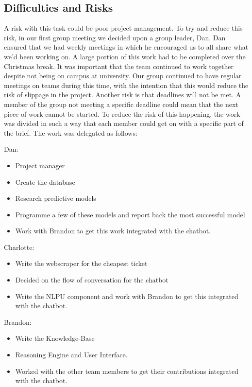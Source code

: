\documentclass[11pt]{article}
\begin{document}
	\subsection{Difficulties and Risks}
	
A risk with this task could be poor project management. To try and reduce this risk, in our first group meeting we decided upon a group leader, Dan. Dan ensured that we had weekly meetings in which he encouraged us to all share what we’d been working on. A large portion of this work had to be completed over the Christmas break. It was important that the team continued to work together despite not being on campus at university. Our group continued to have regular meetings on teams during this time, with the intention that this would reduce the risk of slippage in the project. 
Another risk is that deadlines will not be met. A member of the group not meeting a specific deadline could mean that the next piece of work cannot be started. To reduce the risk of this happening, the work was divided in such a way that each member could get on with a specific part of the brief. The work was delegated as follows:


Dan:
\begin{itemize}
	\item Project manager
	\item Create the database
	\item Research predictive models
	\item Programme a few of these models and report back the most successful model
	\item Work with Brandon to get this work integrated with the chatbot.
\end{itemize}
Charlotte:
\begin{itemize}
	\item Write the webscraper for the cheapest ticket
	\item Decided on the flow of conversation for the chatbot
	\item Write the NLPU component and work with Brandon to get this integrated with the chatbot.
\end{itemize}
Brandon: 
\begin{itemize}
	\item Write the Knowledge-Base
	\item Reasoning Engine and User Interface. 
	\item Worked with the other team members to get their contributions integrated with the chatbot. 
\end{itemize}
\end{document}
